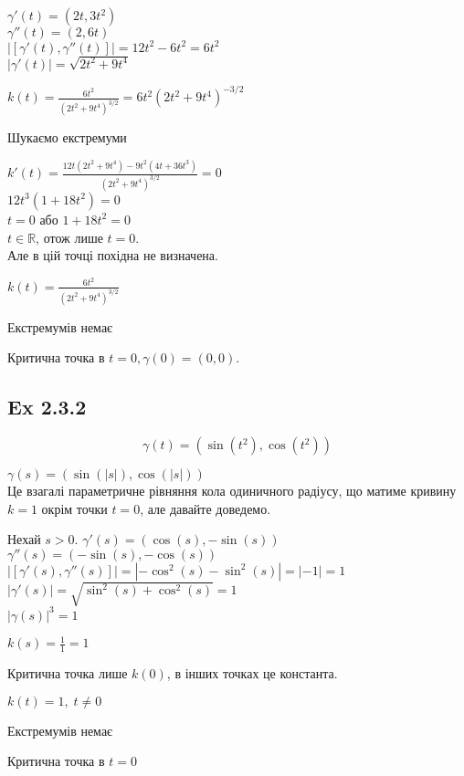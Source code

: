 \documentclass[10pt, a4paper]{article} %
\newcommand{\R}{\mathbb{R}}
\begin{document}
$\gamma'(t) = (2t, 3t^2)$\\
$\gamma''(t) = (2, 6t)$\\
$|[\gamma'(t), \gamma''(t)]| = 12t^2 - 6t^2 = 6t^2$\\
$|\gamma'(t)| = \sqrt{2t^2+9t^4}$

$k(t) = \frac{6t^2}{(2t^2+9t^4)^{3/2}} = 6t^2(2t^2+9t^4)^{-3/2}$

Шукаємо екстремуми

$k'(t) = \frac{12t(2t^2+9t^4)-9t^2(4t+36t^3)}{(2t^2+9t^4)^{3/2}} = 0$\\
$12t^3(1+18t^2) = 0$\\
$t=0$ або $1+18t^2=0$\\
$t\in \R$, отож лише $t=0$.\\
Але в цій точці похідна не визначена.

\begin{mdframed}[backgroundcolor=green!20]
    $k(t) = \frac{6t^2}{(2t^2+9t^4)^{3/2}}$

    Екстремумів немає

    Критична точка в $t=0, \gamma(0) = (0,0)$.
\end{mdframed}


\subsection*{Ex 2.3.2}
\[\gamma(t) = (\sin(t^2), \cos(t^2))\]

$\gamma(s) = (\sin(|s|), \cos(|s|))$\\
Це взагалі параметричне рівняння кола одиничного радіусу, 
що матиме кривину $k=1$ окрім точки $t=0$, але давайте доведемо.

Нехай $s>0$.
$\gamma'(s) = (\cos(s), -\sin(s))$\\
$\gamma''(s) = (-\sin(s), -\cos(s))$\\
$|[\gamma'(s), \gamma''(s)]| = |-\cos^2(s)-\sin^2(s)| = |-1| = 1$\\
$|\gamma'(s)| = \sqrt{\sin^2(s) + \cos^2(s)} = 1$\\
$|\gamma(s)|^{3} = 1$

$k(s) = \frac{1}{1} = 1$

Критична точка лише $k(0)$, в інших точках це константа. 

\begin{mdframed}[backgroundcolor=green!20]
    $k(t) = 1, \; t\ne 0$

    Екстремумів немає

    Критична точка в $t=0$
\end{mdframed}
\end{document}
